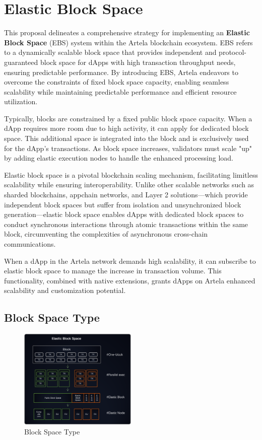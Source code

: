 \section{Elastic Block Space}

This proposal delineates a comprehensive strategy for implementing an \textbf{Elastic Block Space} (EBS) system within the Artela blockchain ecosystem. EBS refers to a dynamically scalable block space that provides independent and protocol-guaranteed block space for dApps with high transaction throughput needs, ensuring predictable performance. By introducing EBS, Artela endeavors to overcome the constraints of fixed block space capacity, enabling seamless scalability while maintaining predictable performance and efficient resource utilization.

Typically, blocks are constrained by a fixed public block space capacity. When a dApp requires more room due to high activity, it can apply for dedicated block space. This additional space is integrated into the block and is exclusively used for the dApp’s transactions. As block space increases, validators must scale "up" by adding elastic execution nodes to handle the enhanced processing load.

Elastic block space is a pivotal blockchain scaling mechanism, facilitating limitless scalability while ensuring interoperability. Unlike other scalable networks such as sharded blockchains, appchain networks, and Layer 2 solutions—which provide independent block spaces but suffer from isolation and unsynchronized block generation—elastic block space enables dApps with dedicated block spaces to conduct synchronous interactions through atomic transactions within the same block, circumventing the complexities of asynchronous cross-chain communications.

When a dApp in the Artela network demands high scalability, it can subscribe to elastic block space to manage the increase in transaction volume. This functionality, combined with native extensions, grants dApps on Artela enhanced scalability and customization potential.

\subsection{Block Space Type}

\begin{figure}[htp]
\centering
\includegraphics[width=0.5\textwidth]{sections/images/elastic-block-space.png}
\caption{Block Space Type}
\end{figure}

